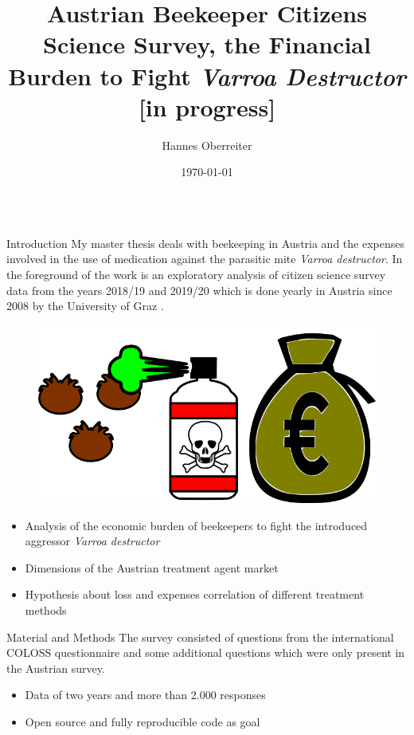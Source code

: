 \documentclass{beamer}
\title{Austrian Beekeeper Citizens Science Survey, the Financial Burden to Fight \textit{Varroa Destructor} \large{[in progress]}}
\author[\faEnvelope{} hoberreiter@gmail.com \faTwitter{} @btree\_hannes]{Hannes Oberreiter}
\institute{University Graz, Institut of Biology}
\date{\today}
\begin{document}
\begin{frame}{} 

\begin{columns}[t]
  \begin{column}{0.49\textwidth}

    \begin{block}{Introduction}
      My master thesis deals with beekeeping in Austria and the expenses involved in the use of medication against the parasitic mite \textit{Varroa destructor}. In the foreground of the work is an exploratory analysis of citizen science survey data from the years 2018/19 and 2019/20 which is done yearly in Austria since 2008 by the University of Graz \citep{brodschneider2013}.
      \\
      \begin{figure}
        \centering
        \includegraphics[width=.5\textwidth]{img/drawing.png}
      \end{figure}
      \setlength{\leftmargini}{95pt}
      \begin{itemize}
        \setlength{\itemindent}{-30pt}
        \LARGE
          \item Analysis of the economic burden of beekeepers to fight the introduced aggressor \textit{Varroa destructor}
          \item Dimensions of the Austrian treatment agent market
          \item Hypothesis about loss and expenses correlation of different treatment methods
      \end{itemize}
      \vspace{39pt}
    \end{block}

    \begin{block}{Material and Methods}
      The survey consisted of questions from the international COLOSS questionnaire \citep{vanderzee2013} and some additional questions which were only present in the Austrian survey.
        
      \setlength{\leftmargini}{95pt}
      \begin{itemize}
        \setlength{\itemindent}{-30pt}
        \LARGE
          \item Data of two years and more than 2.000 responses
          \item Open source and fully reproducible code as goal
      \end{itemize}
    

\end{block}
\end{column}
\end{columns}
\end{frame}
\end{document}
